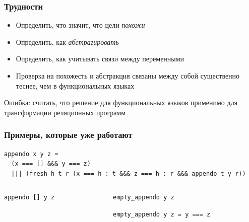\documentclass{beamer}
\begin{document}
\begin{frame}[fragile]
  \transwipe[direction=90]
  \frametitle{Трудности}
\begin{itemize}
  \item Определить, что значит, что цели \emph{похожи}
  \item Определить, как \emph{абстрагировать}
  \item Определить, как учитывать связи между переменными
  \item Проверка на похожесть и абстракция связаны между собой существенно теснее, чем в функциональных языках
\end{itemize}

\bigskip

Ошибка: считать, что решение для функциональных языков применимо для трансформации реляционных программ
\end{frame}

\begin{frame}[fragile,t]
  \transwipe[direction=90]
  \frametitle{Примеры, которые уже работают}
\begin{center}
\begin{minipage}[c]{9.5cm}
\begin{lstlisting}[frame=single]  
appendo x y z = 
  (x === [] &&& y === z)
  ||| (fresh h t r (x === h : t &&& z === h : r &&& appendo t y r))
\end{lstlisting}
\end{minipage}
\end{center}

\begin{columns}[t]
\begin{column}{3.4cm}
\begin{badcode}
\begin{lstlisting}[frame=single]  
appendo [] y z
\end{lstlisting}
\end{badcode}
\end{column}

\pause

\begin{column}{5.5cm}
\begin{goodcode}
\begin{lstlisting}[frame=single]  
empty_appendo y z
\end{lstlisting}

\begin{lstlisting}[frame=single]  
empty_appendo y z = y === z
\end{lstlisting}
\end{goodcode}
\end{column}
\end{columns}
\end{frame}
\end{document}

